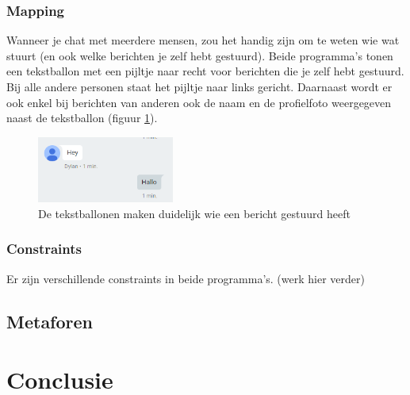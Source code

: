 \documentclass[11pt]{article}
\begin{document}
\subsubsection{Mapping}
Wanneer je chat met meerdere mensen, zou het handig zijn om te weten wie wat stuurt (en ook welke berichten je zelf hebt gestuurd). Beide programma's tonen een tekstballon met een pijltje naar recht voor berichten die je zelf hebt gestuurd. Bij alle andere personen staat het pijltje naar links gericht. Daarnaast wordt er ook enkel bij berichten van anderen ook de naam en de profielfoto weergegeven naast de tekstballon (figuur \ref{fig:HChat}).
\begin{figure}
	\centering
	\includegraphics[width=0.4\textwidth]{Dylan_HChat.png}
	\caption{De tekstballonen maken duidelijk wie een bericht gestuurd heeft}
	\label{fig:HChat}
\end{figure}
\subsubsection{Constraints}
Er zijn verschillende constraints in beide programma's. (werk hier verder)
\subsection{Metaforen}
\newpage


\section{Conclusie}

\newpage
\end{document}
